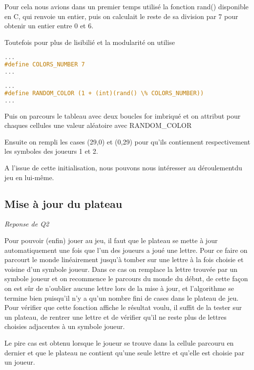 \documentclass[a4paper,11pt]{article}
\begin{document}
Pour cela nous avions dans un premier temps  utilisé la fonction rand() disponible en C, qui renvoie un entier, puis on calculait le reste de sa division par 7 pour obtenir un entier entre 0 et 6. 

Toutefois pour plus de lisibilié et la modularité on utilise 
\begin{lstlisting}[language=C, caption=parameters.h]
...
#define COLORS_NUMBER 7
...
\end{lstlisting}

\begin{lstlisting}[language=C, caption=board.h]
...
#define RANDOM_COLOR (1 + (int)(rand() \% COLORS_NUMBER))
...
\end{lstlisting}

Puis on parcours le tableau avec deux boucles for imbriqué et on attribut pour chaques cellules une valeur aléatoire avec RANDOM\_COLOR

Ensuite on rempli les cases (29,0) et (0,29) pour qu'ils contiennent respectivement les symboles des joueurs 1 et 2.

A l'issue de cette initialisation, nous pouvons nous intéresser au déroulementdu jeu en lui-même.

\subsection{Mise à jour du plateau}
\emph{Reponse de Q2}

Pour pouvoir (enfin) jouer au jeu, il faut que le plateau se mette à jour automatiquement une fois que l'un des joueurs a joué une lettre. Pour ce faire on parcourt le monde linéairement jusqu'à tomber sur une lettre à la fois choisie et voisine d'un symbole joueur. Dans ce cas on remplace la lettre trouvée par un symbole joueur et on recommence le parcours du monde du début, de cette façon on est sûr de n'oublier aucune lettre lors de la mise à jour, et l'algorithme se termine bien puisqu'il n'y a qu'un nombre fini de cases dans le plateau de jeu. Pour vérifier que cette fonction affiche le résultat voulu, il suffit de la tester sur un plateau, de rentrer une lettre et de vérifier qu'il ne reste plus de lettres choisies adjacentes à un symbole joueur. 

Le pire cas est obtenu lorsque le joueur se trouve dans la cellule parcouru en dernier et que le plateau ne contient qu'une seule lettre et qu'elle est choisie par un joueur.
\end{document}
